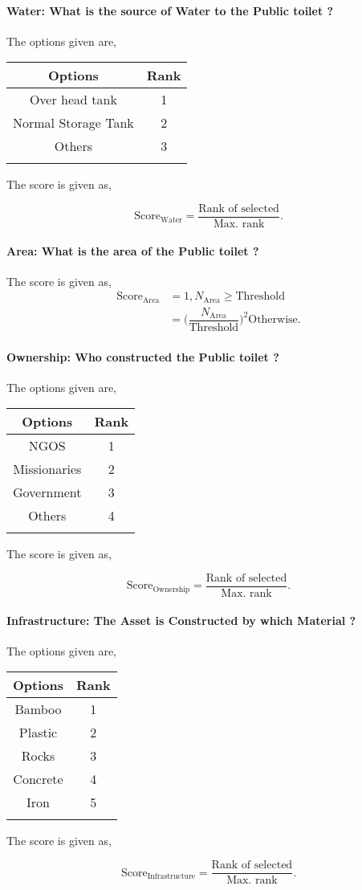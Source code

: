 \documentclass[oneside,twocolumn]{article}
\newcommand{\tsub}[2]{\text{#1}_{\text{#2}}}
\newcommand{\tsubb}[2]{#1_{\text{#2}}}
\newcommand{\dsub}[2]{\dfrac{\text{#1}}{\text{#2}}}
\newcommand{\singsel}[1]
{
	\[
		\tsub{Score}{#1} = \dsub{Rank of selected}{Max. rank}.
	\]
}
\newenvironment{ttable}
{
\begin{center}
\begin{tabular}{c|c}
\hline
}
{
\\ \hline
\end{tabular}
\end{center}
}
\begin{document}
\paragraph{Water: 
What is the source of Water to the Public toilet ? 
}

The options given are,
\begin{ttable}
Options & Rank \\ \hline
Over head tank & 1 \\
Normal Storage Tank & 2 \\
 Others & 3 \\
\hline
\end{ttable}
The score is given as,
\singsel{Water}
\paragraph{Area: 
What is the area of the Public toilet ? 
}

The score is given as,
\begin{align*}
\tsub{Score}{Area} &= 1, \tsubb{N}{Area} \ge \text{Threshold} \\
        &=
\Big(\dfrac{\tsubb{N}{Area}}{\text{Threshold}}\Big)^{2}
\text{Otherwise}.
\end{align*}
\paragraph{Ownership: 
Who constructed the Public toilet ? 
}

The options given are,
\begin{ttable}
Options & Rank \\ \hline
NGOS & 1 \\
Missionaries & 2 \\
Government & 3 \\
Others & 4 \\
\hline
\end{ttable}
The score is given as,
\singsel{Ownership}
\paragraph{Infrastructure: 
The Asset is Constructed by which Material ?
}

The options given are,
\begin{ttable}
Options & Rank \\ \hline
Bamboo & 1 \\
Plastic & 2 \\
Rocks & 3 \\
Concrete & 4 \\
Iron & 5 \\
\hline
\end{ttable}
The score is given as,
\singsel{Infrastructure}
\end{document}

